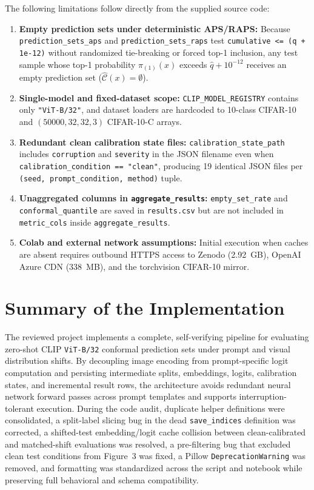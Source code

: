 \documentclass[11pt,a4paper]{article}
\begin{document}
The following limitations follow directly from the supplied source code:
\begin{enumerate}
  \item \textbf{Empty prediction sets under deterministic APS/RAPS:} Because \texttt{prediction\_\allowbreak{}sets\_\allowbreak{}aps} and \texttt{prediction\_\allowbreak{}sets\_\allowbreak{}raps} test \texttt{cumulative <= (q + 1e-12)} without randomized tie-breaking or forced top-1 inclusion, any test sample whose top-1 probability $\pi_{(1)}(x)$ exceeds $\hat{q} + 10^{-12}$ receives an empty prediction set ($\widehat{\mathcal{C}}(x) = \emptyset$).
  \item \textbf{Single-model and fixed-dataset scope:} \texttt{CLIP\_\allowbreak{}MODEL\_\allowbreak{}REGISTRY} contains only \texttt{"ViT-B/\allowbreak{}32"}, and dataset loaders are hardcoded to 10-class CIFAR-10 and $(50000, 32, 32, 3)$ CIFAR-10-C arrays.
  \item \textbf{Redundant clean calibration state files:} \texttt{calibration\_\allowbreak{}state\_\allowbreak{}path} includes \texttt{corruption} and \texttt{severity} in the JSON filename even when \texttt{calibration\_\allowbreak{}condition == "clean"}, producing 19 identical JSON files per \texttt{(seed, prompt\_\allowbreak{}condition, method)} tuple.
  \item \textbf{Unaggregated columns in \texttt{aggregate\_\allowbreak{}results}:} \texttt{empty\_\allowbreak{}set\_\allowbreak{}rate} and \texttt{conformal\_\allowbreak{}quantile} are saved in \texttt{results.csv} but are not included in \texttt{metric\_\allowbreak{}cols} inside \texttt{aggregate\_\allowbreak{}results}.
  \item \textbf{Colab and external network assumptions:} Initial execution when caches are absent requires outbound HTTPS access to Zenodo (2.92~GB), OpenAI Azure CDN (338~MB), and the torchvision CIFAR-10 mirror.
\end{enumerate}

\section{Summary of the Implementation}
\label{sec:summary}

The reviewed project implements a complete, self-verifying pipeline for evaluating zero-shot CLIP \texttt{ViT-B/\allowbreak{}32} conformal prediction sets under prompt and visual distribution shifts. By decoupling image encoding from prompt-specific logit computation and persisting intermediate splits, embeddings, logits, calibration states, and incremental result rows, the architecture avoids redundant neural network forward passes across prompt templates and supports interruption-tolerant execution. During the code audit, duplicate helper definitions were consolidated, a split-label slicing bug in the dead \texttt{save\_\allowbreak{}indices} definition was corrected, a shifted-test embedding/logit cache collision between clean-calibrated and matched-shift evaluations was resolved, a pre-filtering bug that excluded clean test conditions from Figure~3 was fixed, a Pillow \texttt{DeprecationWarning} was removed, and formatting was standardized across the script and notebook while preserving full behavioral and schema compatibility.
\end{document}
